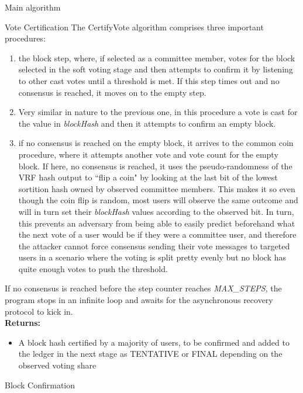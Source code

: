 \documentclass[10pt,a4paper]{article}
\begin{document}
\begin{section}{Main algorithm}
\begin{subsection}{Vote Certification}
The {\sf CertifyVote} algorithm comprises three important procedures: 
\begin{enumerate}
    \item the block step, where, if selected as a committee member, votes for the block selected in 
    the soft voting stage and then attempts to confirm it by listening to other cast votes until a 
    threshold is met. If this step times out and no consensus is reached, it moves on to the empty 
    step. 
    \item Very similar in nature to the previous one, in this procedure a vote is cast for the 
    value in {\em blockHash} and then it attempts to confirm an empty block.
    \item if no consensus is reached on the empty block, it arrives to the common coin procedure, 
    where it attempts another vote and vote count for the empty block. 
    If here, no consensus is reached, it uses the pseudo-randomness of the VRF hash output to ``flip a coin" 
    by looking at the last bit of the lowest sortition hash owned by observed committee members.
    This makes it so even though the coin flip is random, most users will observe the same outcome and will 
    in turn set their {\em blockHash} values according to the observed bit. 
    In turn, this prevents an adversary from being able to easily predict beforehand what the next vote 
    of a user would be if they were a committee user, and therefore the attacker cannot force consensus 
    sending their vote messages to targeted users in a scenario where the voting is split pretty evenly 
    but no block has quite enough votes to push the threshold.
\end{enumerate}
If no consensus is reached before the step counter reaches {\em MAX\_STEPS}, 
the program stops in an infinite loop and awaits for the asynchronous recovery
protocol to kick in.\\

\noindent \textbf{Returns:}
\begin{itemize}
    \item A block hash certified by a majority of users, to be confirmed and added to the ledger in the next stage as TENTATIVE or FINAL depending
    on the observed voting share
  \end{itemize}


\end{subsection}
\begin{subsection}{Block Confirmation}\label{ssect:blockconfirmation}


\end{subsection}
\end{section}
\end{document}
